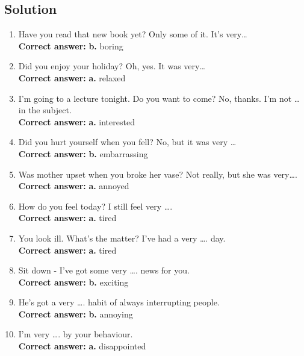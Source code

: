 \subsection*{Solution}
\begin{enumerate}
      \item {} Have you read that new book yet?
             Only some of it. It’s very…\\
            \textbf{Correct answer:} \textbf{b.} boring

      \item {} Did you enjoy your holiday?
             Oh, yes. It was very…\\
            \textbf{Correct answer:} \textbf{a.} relaxed

      \item {} I'm going to a lecture tonight. Do you want to come?
             No, thanks. I'm not … in the subject.\\
            \textbf{Correct answer:} \textbf{a.} interested

      \item {} Did you hurt yourself when you fell?
             No, but it was very …\\
            \textbf{Correct answer:} \textbf{b.} embarrassing

      \item {} Was mother upset when you broke her vase?
             Not really, but she was very….\\
            \textbf{Correct answer:} \textbf{a.} annoyed

      \item {} How do you feel today?
             I still feel very ….\\
            \textbf{Correct answer:} \textbf{a.} tired

      \item {} You look ill. What’s the matter?
             I’ve had a very …. day.\\
            \textbf{Correct answer:} \textbf{a.} tired

      \item Sit down - I've got some very …. news for you.\\
            \textbf{Correct answer:} \textbf{b.} exciting

      \item He's got a very …. habit of always interrupting people.\\
            \textbf{Correct answer:} \textbf{b.} annoying

      \item I'm very …. by your behaviour.\\
            \textbf{Correct answer:} \textbf{a.} disappointed
\end{enumerate}

